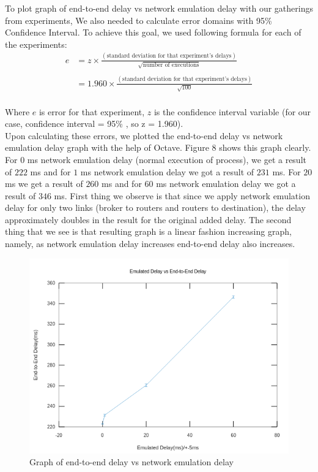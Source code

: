 \documentclass[conference]{IEEEtran}
\begin{document}
To plot graph of end-to-end delay vs network emulation delay with our gatherings from experiments, We also needed to calculate error domains with 95\% Confidence Interval. To achieve this goal, we used following formula for each of the experiments: \\

\begin{align*}
 e &= z \times \frac{(\text{standard deviation for that experiment's delays})}{\sqrt{\text{number of executions}}}  \\\\
   &= 1.960 \times \frac{(\text{standard deviation for that experiment's delays})}{\sqrt{100}} \\
\end{align*}

Where $e$ is error for that experiment, $z$ is the confidence interval variable (for our case, confidence interval = 95\% , so z = 1.960). \\

Upon calculating these errors, we plotted the end-to-end delay vs network emulation delay graph with the help of Octave. Figure 8 shows this graph clearly. \\

For $0$ ms network emulation delay (normal execution of process), we get a result of $222$ ms and for $1$ ms network emulation delay we got a result of $231$ ms. For $20$ ms we get a result of $260$ ms and for $60$ ms network emulation delay we got a result of $346$ ms. First thing we observe is that since we apply network emulation delay for only two links (broker to routers and routers to destination), the delay approximately doubles in the result for the original added delay. The second thing that we see is that resulting graph is a linear fashion increasing graph, namely, as network emulation delay increases end-to-end delay also increases.

\begin{figure}
    \centering
    \includegraphics[scale=0.4]{graph.png}
    \caption{Graph of end-to-end delay vs network emulation delay}
\end{figure}
\end{document}
